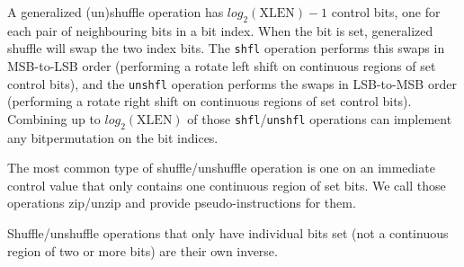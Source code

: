 A generalized (un)shuffle operation has $log_2(\textrm{XLEN})-1$ control bits,
one for each pair of neighbouring bits in a bit index. When the bit is set,
generalized shuffle will swap the two index bits. The {\tt shfl} operation
performs this swaps in MSB-to-LSB order (performing a rotate left shift on
continuous regions of set control bits), and the {\tt unshfl} operation performs
the swaps in LSB-to-MSB order (performing a rotate right shift on continuous
regions of set control bits). Combining up to $log_2(\textrm{XLEN})$ of those
{\tt shfl}/{\tt unshfl} operations can implement any bitpermutation on the
bit indices.

The most common type of shuffle/unshuffle operation is one on an immediate
control value that only contains one continuous region of set bits. We call
those operations zip/unzip and provide pseudo-instructions for them.

Shuffle/unshuffle operations that only have individual bits set (not a continuous
region of two or more bits) are their own inverse.

